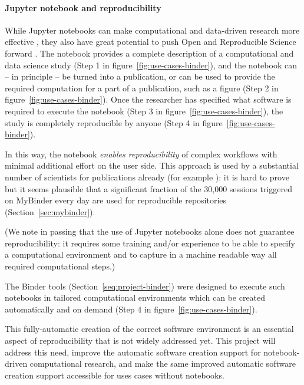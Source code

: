 
\paragraph{Jupyter notebook and reproducibility}

While Jupyter notebooks can make computational and data-driven research more effective
\cite{Perkel2018,Fangohr2020,Granger2021}, they also have great potential to push
Open and Reproducible Science forward \cite{Beg2021}. The notebook provides a complete
description of a computational and data science study (Step 1 in
figure~\ref{fig:use-cases-binder}), and the notebook can -- in principle -- be
turned into a publication, or can be used to provide the required computation
for a part of a publication, such as a figure (Step 2 in
figure~\ref{fig:use-cases-binder}). Once the researcher has specified what
software is required to execute the notebook (Step 3 in
figure~\ref{fig:use-cases-binder}), the study is completely reproducible by
anyone (Step 4 in figure~\ref{fig:use-cases-binder}).

In this way, the notebook \emph{enables reproducibility} of complex workflows
with minimal additional effort on the user side. This approach is used by a
substantial number of scientists for publications already (for example
): it is hard to prove
but it seems plausible that a significant fraction of the 30,000 sessions
triggered on MyBinder every day are used for reproducible repositories
(Section~\ref{sec:mybinder}).

(We note in passing that the use of Jupyter notebooks alone does not guarantee
reproducibility: it requires some training and/or experience to be able to specify a
computational environment and to capture in a machine readable way all required
computational steps.)

The Binder tools (Section~\ref{seq:project-binder}) were designed to execute
such notebooks in tailored computational environments which can be created
automatically and on demand (Step 4 in figure~\ref{fig:use-cases-binder}).

This fully-automatic creation of the correct software environment is an
essential aspect of reproducibility that is not widely addressed yet. This
project will address this need, improve the automatic software creation support
for notebook-driven computational research, and make the same improved automatic
software creation support accessible for uses cases without notebooks.

